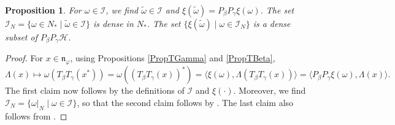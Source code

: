 \documentclass[11pt]{article}
\numberwithin{equation}{section}
\newtheorem{prop}[thm]{Proposition}
\theoremstyle{definition}
\newcommand{\cHil}{\mathcal{H}}
\newcommand{\nphi}{\mathfrak{n}_\varphi}
\begin{document}
\begin{prop}\label{PropDualSqInt}
  For $\omega \in \mathcal{I}$, we find $\tilde{\omega}  \in \mathcal{I}$ and $\xi(\tilde{\omega}  ) = P_\beta P_\gamma \xi(\omega)$. The set $\mathcal{I}_N = \{ \omega \in N_\ast \mid \tilde{\omega} \in \mathcal{I} \}$ is dense in $N_\ast$. The set $\{ \xi(\tilde{\omega}) \mid \omega \in \mathcal{I}_N \}$ is a dense subset of $P_\beta P_\gamma \cHil$.
\end{prop}
\begin{proof}
For $x \in \nphi$, using Propositions \ref{PropTGamma} and \ref{PropTBeta},
\[
 \Lambda(x) \mapsto \omega (T_\beta  T_\gamma(x^\ast)) =   \omega ((T_\beta T_\gamma(x))^\ast) = \langle \xi(\omega), \Lambda(T_\beta T_\gamma(x)) \rangle = \langle P_\beta P_\gamma \xi(\omega), \Lambda(x) \rangle.
\]
The f\/irst claim now follows by the def\/initions of $\mathcal{I}$ and $\xi(\cdot)$. Moreover, we f\/ind $\mathcal{I}_N = \{ \omega\vert_N \mid \omega \in \mathcal{I} \}$, so that the second claim follows by \cite[Lemma 8.5]{KusVae}. The last claim also follows from \cite[Lemma 8.5]{KusVae}.
\end{proof}
\end{document}
